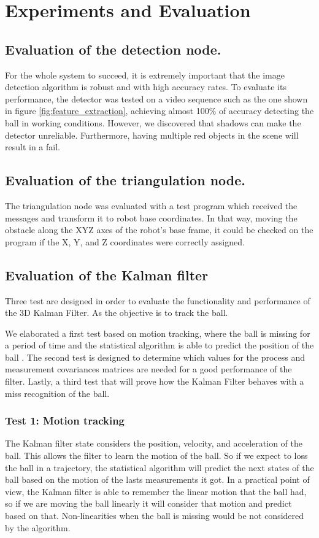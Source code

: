 \newpage
\section{Experiments and Evaluation}

\subsection{Evaluation of the detection node.}

For the whole system to succeed, it is extremely important that the image detection algorithm is robust and with high accuracy rates. To evaluate its performance, the detector was tested on a video sequence such as the one shown in figure \ref{fig:feature_extraction}, achieving almost 100\% of accuracy detecting the ball in working conditions. However, we discovered that shadows can make the detector unreliable. Furthermore, having multiple red objects in the scene will result in a fail.

\subsection{Evaluation of the triangulation node.}

The triangulation node was evaluated with a test program which received the messages and transform it to robot base coordinates. In that way, moving the obstacle along the XYZ axes of the robot's base frame, it could be checked on the program if the X, Y, and Z coordinates were correctly assigned.

\subsection{Evaluation of the Kalman filter}
Three test are designed in order to evaluate the functionality and performance of the 3D Kalman Filter. As the objective is to track the ball.

We elaborated a first test based on motion tracking, where the ball is missing for a period of time and the statistical algorithm is able to predict the position of the ball . 
The second test is designed to determine which values for the process and measurement covariances matrices are needed for a good performance of the filter. Lastly, a third test that will prove how the Kalman Filter behaves with a miss recognition of the ball.
\newpage
\subsubsection{Test 1: Motion tracking}
The Kalman filter state considers the position, velocity, and acceleration of the ball. This allows the filter to learn the motion of the ball. So if we expect to loss the ball in a trajectory, the statistical algorithm will predict the next states of the ball based on the motion of the lasts measurements it got. In a practical point of view, the Kalman filter is able to remember the linear motion that the ball had, so if we are moving the ball linearly it will consider that motion and predict based on that. Non-linearities when the ball is missing would be not considered by the algorithm.

